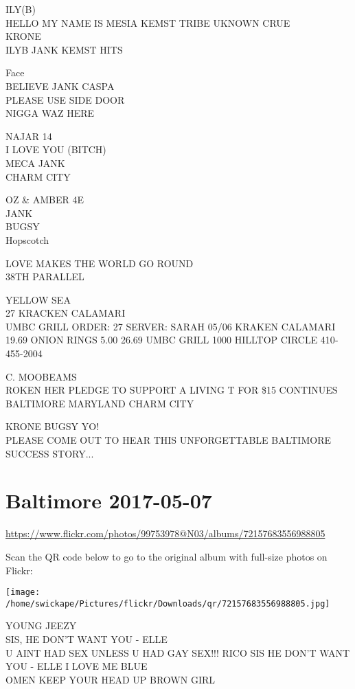 \documentclass[10pt,letterpaper]{article}
\begin{document}
ILY(B)\\
HELLO MY NAME IS MESIA KEMST TRIBE UKNOWN CRUE\\
KRONE\\
ILYB JANK KEMST HITS

Face\\
BELIEVE JANK CASPA\\
PLEASE USE SIDE DOOR\\
NIGGA WAZ HERE

NAJAR 14\\
I LOVE YOU (BITCH)\\
MECA JANK\\
CHARM CITY

OZ \& AMBER 4E\\
JANK\\
BUGSY\\
Hopscotch

LOVE MAKES THE WORLD GO ROUND\\
38TH PARALLEL

YELLOW SEA\\
27 KRACKEN CALAMARI\\
UMBC GRILL ORDER: 27 SERVER: SARAH 05/06 KRAKEN CALAMARI 19.69 ONION RINGS 5.00 26.69 UMBC GRILL 1000 HILLTOP CIRCLE 410{-}455{-}2004

C. MOOBEAMS\\
ROKEN HER PLEDGE TO SUPPORT A LIVING T FOR \$15 CONTINUES\\
BALTIMORE MARYLAND CHARM CITY

KRONE BUGSY YO!\\
PLEASE COME OUT TO HEAR THIS UNFORGETTABLE BALTIMORE SUCCESS STORY...


\section*{Baltimore 2017-05-07}

\url{https://www.flickr.com/photos/99753978@N03/albums/72157683556988805}

Scan the QR code below to go to the original album with full-size photos on Flickr:

\texttt{[image: /home/swickape/Pictures/flickr/Downloads/qr/72157683556988805.jpg]}


YOUNG JEEZY\\
SIS, HE DON'T WANT YOU {-} ELLE\\
U AINT HAD SEX UNLESS U HAD GAY SEX!!! RICO SIS HE DON'T WANT YOU {-} ELLE I LOVE ME BLUE\\
OMEN KEEP YOUR HEAD UP BROWN GIRL
\end{document}
